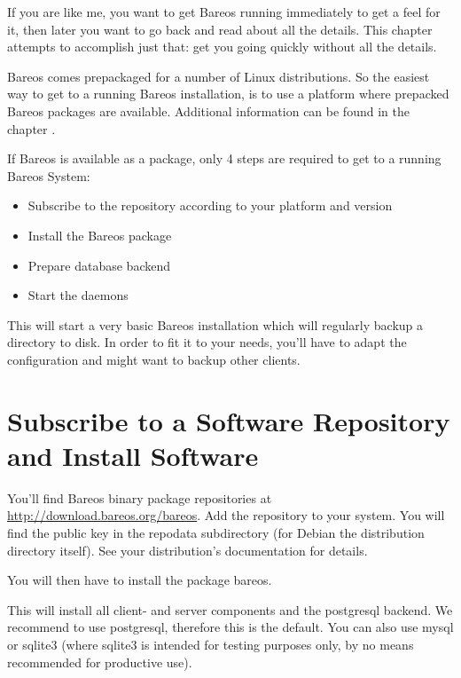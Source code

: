 If you are like me, you want to get Bareos running immediately to get a feel
for it, then later you want to go back and read about all the details. This
chapter attempts to accomplish just that: get you going quickly without all
the details.

Bareos comes prepackaged for a number of Linux distributions.
So the easiest way to get to a running Bareos installation, 
is to use a platform where prepacked Bareos packages are available.
Additional information can be found in the chapter .


If Bareos is available as a package, 
only 4 steps are required to get to a running Bareos System:
\begin{itemize}
    \item Subscribe to the repository according to your platform and version
    \item Install the Bareos package
    \item Prepare database backend
    \item Start the daemons
\end{itemize}

This will start a very basic Bareos installation which will regularly backup a directory to disk.
In order to fit it to your needs, you'll have to adapt the configuration and might want to backup other clients.

\section{Subscribe to a Software Repository and Install Software}

You'll find Bareos binary package repositories at \url{http://download.bareos.org/bareos}.
Add the repository to your system. 
You will find the public key in the repodata subdirectory 
(for Debian the distribution directory itself). 
See your distribution's documentation for details.
 
You will then have to install the package bareos. 

This will install all client- and server components and the postgresql backend. 
We recommend to use postgresql, therefore this is the default. 
You can also use mysql or sqlite3 
(where sqlite3 is intended for testing purposes only, by no means recommended for productive use).


